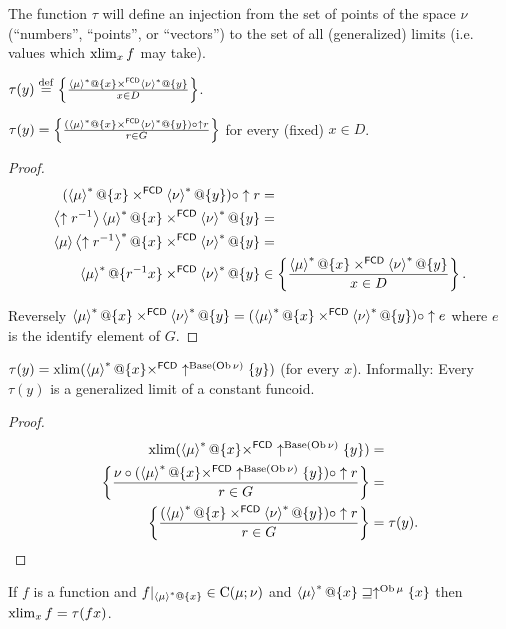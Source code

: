 The function $\tau$ will define an injection from the set of points
of the space $\nu$ (``numbers'', ``points'', or ``vectors'')
to the set of all (generalized) limits (i.e. values which $\operatorname{xlim}_{x}f$
may take).
\begin{defn}
$\tau(y)\overset{\mathrm{def}}{=}\left\{ \frac{\left\langle \mu\right\rangle ^{\ast}@\{x\}\times^{\mathsf{FCD}}\left\langle \nu\right\rangle ^{\ast}@\{y\}}{x\in D}\right\}$.\end{defn}
\begin{prop}
$\tau(y)=\left\{ \frac{(\left\langle \mu\right\rangle ^{\ast}@\{x\}\times^{\mathsf{FCD}}\left\langle \nu\right\rangle ^{\ast}@\{y\})\circ\uparrow r}{r\in G}\right\}$
for every (fixed) $x\in D$.\end{prop}
\begin{proof}
~
\begin{align*}
(\left\langle \mu\right\rangle ^{\ast}@\{x\}\times^{\mathsf{FCD}}\left\langle \nu\right\rangle ^{\ast}@\{y\})\circ\uparrow r & =\\
\left\langle \uparrow r^{-1}\right\rangle\left\langle \mu\right\rangle ^{\ast}@\{x\}\times^{\mathsf{FCD}}\left\langle \nu\right\rangle ^{\ast}@\{y\} & =\\
\left\langle \mu\right\rangle\left\langle \uparrow r^{-1}\right\rangle ^{\ast}@\{x\}\times^{\mathsf{FCD}}\left\langle \nu\right\rangle ^{\ast}@\{y\} & =\\
\left\langle \mu\right\rangle ^{\ast}@\{r^{-1}x\}\times^{\mathsf{FCD}}\left\langle \nu\right\rangle ^{\ast}@\{y\} & \in \left\{ \frac{\left\langle \mu\right\rangle ^{\ast}@\{x\}\times^{\mathsf{FCD}}\left\langle \nu\right\rangle ^{\ast}@\{y\}}{x\in D}\right\}.
\end{align*}


Reversely $\left\langle \mu\right\rangle ^{\ast}@\{x\}\times^{\mathsf{FCD}}\left\langle \nu\right\rangle ^{\ast}@\{y\}=(\left\langle \mu\right\rangle ^{\ast}@\{x\}\times^{\mathsf{FCD}}\left\langle \nu\right\rangle ^{\ast}@\{y\})\circ\uparrow e$
where $e$ is the identify element of $G$.\end{proof}
\begin{prop}
$\tau(y)=\operatorname{xlim}(\left\langle \mu\right\rangle ^{\ast}@\{x\}\times^{\mathsf{FCD}}\uparrow^{\operatorname{Base}(\operatorname{Ob}\nu)}\{y\})$
(for every $x$). Informally: Every $\tau(y)$ is a generalized limit
of a constant funcoid.\end{prop}
\begin{proof}
~
\begin{align*}
\operatorname{xlim}(\left\langle \mu\right\rangle ^{\ast}@\{x\}\times^{\mathsf{FCD}}\uparrow^{\operatorname{Base}(\operatorname{Ob}\nu)}\{y\}) & =\\
\left\{ \frac{\nu\circ(\left\langle \mu\right\rangle ^{\ast}@\{x\}\times^{\mathsf{FCD}}\uparrow^{\operatorname{Base}(\operatorname{Ob}\nu)}\{y\})\circ\uparrow r}{r\in G}\right\} & =\\
\left\{ \frac{(\left\langle \mu\right\rangle ^{\ast}@\{x\}\times^{\mathsf{FCD}}\left\langle \nu\right\rangle ^{\ast}@\{y\})\circ\uparrow r}{r\in G}\right\} & =\tau(y).
\end{align*}
\end{proof}
\begin{thm}
If $f$ is a function and $f|_{\left\langle \mu\right\rangle ^{\ast}@\{x\}}\in\mathrm{C}(\mu;\nu)$
and $\left\langle \mu\right\rangle ^{\ast}@\{x\}\sqsupseteq\uparrow^{\operatorname{Ob}\mu}\{x\}$
then $\operatorname{xlim}_{x}f=\tau(fx)$.\end{thm}
